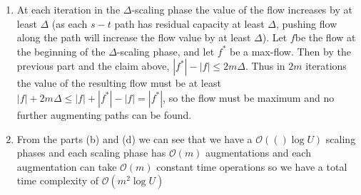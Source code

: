 \documentclass{article}
\newcommand{\bigOh}[1]{\mathcal{O}(#1)}
\begin{document}
\begin{enumerate}
        \item[]At each iteration in the $\Delta$-scaling phase the value of the flow increases by at least $\Delta$ (as each $s-t$ path has residual capacity at least $\Delta$, pushing flow along the path will increase the flow value by at least $\Delta$). Let $f$be the flow at the beginning of the $\Delta$-scaling phase, and let $f^*$ be a max-flow. Then by the previous part and the claim above, $|f^*| -|f| \le 2m \Delta$. Thus in $2m$ iterations the value of the resulting flow must be at least $|f| +2m\Delta \le |f| + |f^*|-|f| = |f^*|$, so the flow must be maximum and no further augmenting paths can be found. 
        \item From the parts (b) and (d) we can see that we have a $\bigOh(\log U)$ scaling phases and each scaling phase has $\bigOh{m}$ augmentations and each augmentation can take $\bigOh{m}$ constant time operations so we have a total time complexity of $\bigOh{m^2\log U}$
    \end{enumerate}
\end{document}
